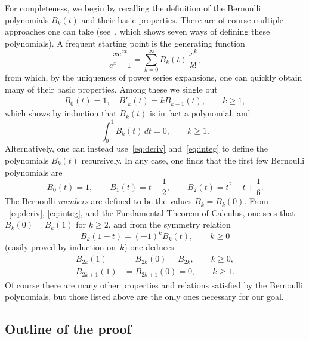 \documentclass[10pt,reqno]{amsart}
\theoremstyle{remark}
\begin{document}
For completeness, we begin by recalling the definition of the Bernoulli polynomials $B_{k}(t)$ and their basic properties. There are of course multiple approaches one can take (see~\cite{CDG}, which shows seven ways of defining these polynomials). A frequent starting point is the generating function
\begin{equation*}
  \frac{x e^{xt}}{e^x-1} = \sum_{k=0}^\infty B_k(t)\, \frac{x^k}{k!},
\end{equation*}
from which, by the uniqueness of power series expansions, one can quickly obtain many of their basic properties. Among these we single out
\begin{gather}
\label{eq:deriv}
  B_{0}(t) = 1,
  \quad
  B'_k(t) = k B_{k-1}(t),
  \qquad k\geq 1,
\end{gather}
which shows by induction that $B_{k}(t)$ is in fact a polynomial, and
%
\begin{equation}
\label{eq:integ}
  \int_{0}^{1} B_{k}(t) \, dt = 0, \qquad k \geq 1.
\end{equation}
%
Alternatively, one can instead use~\eqref{eq:deriv} and~\eqref{eq:integ} to define the polynomials $B_{k}(t)$ recursively.
In any case, one finds that the first few Bernoulli polynomials are
\[
  B_0(t) = 1,
  \qquad
  B_1(t) = t - \frac{1}{2},
  \qquad
  B_2(t) = t^2 - t + \frac{1}{6}.
\]
The Bernoulli \emph{numbers} are defined to be the values $B_k = B_k(0)$. From 
~\eqref{eq:deriv}, \eqref{eq:integ}, and the Fundamental Theorem of Calculus, one sees that $B_{k}(0) = B_{k}(1)$ for $k \geq 2$, and from the symmetry relation
%
\begin{equation*}
  B_k(1-t) = (-1)^k B_k(t),
  \qquad k\geq 0
\end{equation*}
%
(easily proved by induction on~$k$) one deduces
%
\begin{equation}
\label{eq:symBnum}
 \begin{aligned}
    B_{2k}(1) 
 &= B_{2k}(0) = B_{2k},
 \qquad
 k \geq 0,
 \\
    B_{2k+1}(1) 
 &= B_{2k+1}(0) = 0,
 \qquad
 k \geq 1.
 \end{aligned}
\end{equation}
%
Of course there are many other properties and relations satisfied by the Bernoulli polynomials, but those listed above are the only ones necessary for our goal.

\subsection{Outline of the proof}
\end{document}
